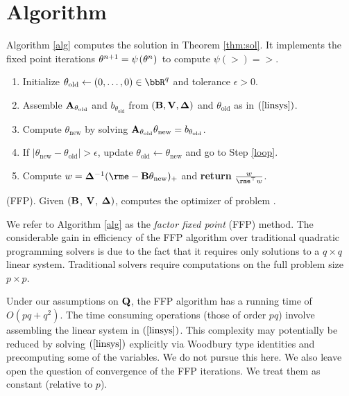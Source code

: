 \documentclass[12pt,leqno,letterpaper]{article}
\begin{document}
\section{Algorithm}  Algorithm \ref{alg} computes the
solution in Theorem \ref{thm:sol}.
It implements the fixed point iterations
$\theta^{n+1} = \psi\hspace{1pt} ( \hspace{0.25pt} {\theta^n} \hspace{0.25pt} ) \hspace{1pt}$ to compute 
$\psi (\gt) = \gt$.

\newcommand{\told}{\theta_{\text{old}}}
\newcommand{\tnew}{\theta_{\text{new}}}

\begin{algorithm}[hpt!]
\vspace{0.16in}
\begin{enumerate}[label=\textbf{\arabic*.},
  itemindent=0.32in, itemsep=0.032in]
\item Initialize $\told \leftarrow (0, \dots, 0) \in \bbR^q$ 
and tolerance $\epsilon > 0$.
\item Assemble $\mat{A}_{\told}$ and $b_{\told}$ 
from 
$(\mathbf{B}, \mathbf{V}, {\bm{\Delta}})$ and $\told$ as in $\req{linsys}$. \label{loop}
\item Compute $\tnew$ by solving 
$\mat{A}_{\told} \tnew = b_{\told}$. 
\item If $| \tnew - \told | >\epsilon$, 
update $\told \leftarrow \tnew$ and go to Step \ref{loop}.
\item Compute $w=\bdel^{-1}(\rme-\mat{B} \tnew)_+$
and {\bf return} $\frac{w}{\rme^\top w}$.
\end{enumerate}
\caption{(FFP). Given $(\mathbf{B}$, $\mathbf{V}$, ${\bm{\Delta}})$, computes
the optimizer of problem . }
\label{alg}
\end{algorithm}
We refer to Algorithm \ref{alg} as the \emph{factor fixed point}
(FFP) method. The considerable gain in efficiency of the FFP
algorithm over traditional quadratic programming solvers is due
to the fact that it requires only solutions to a $q \times q$
linear system. Traditional solvers require computations on
the full problem size $p \times p$. 


 Under our assumptions on $\mathbf{Q}$, the FFP algorithm
has a running time of $O(pq + q^2)$. The time consuming
operations (those of order $pq$) involve assembling the linear
system in $\req{linsys}$. This complexity
may potentially be reduced by solving $\req{linsys}$
explicitly via Woodbury type identities and precomputing some of
the variables. We do not pursue this here. We also leave open
the question of convergence of the FFP iterations. We treat them
as constant (relative to $p$).
\end{document}
